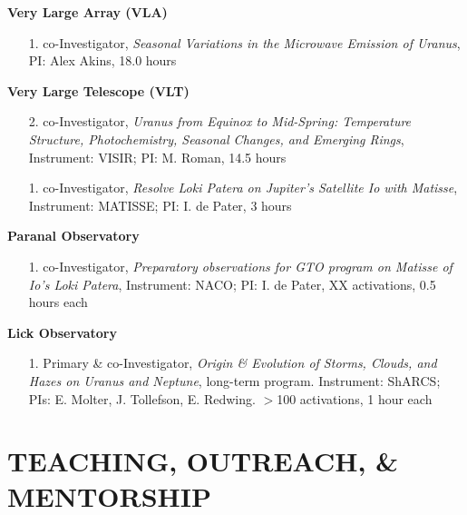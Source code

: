 \documentclass[margin, 10pt]{res} %
\begin{document}
\begin{resume}
\begin{enumerate}
\end{enumerate}
\vspace{-0.3cm}
\textbf{Very Large Array (VLA)}
\begin{enumerate}
	\item[1.] co-Investigator, {\it Seasonal Variations in the Microwave Emission of Uranus}, PI: Alex Akins, 18.0 hours %
\end{enumerate}
\vspace{-0.3cm}
\textbf{Very Large Telescope (VLT)} 
\begin{enumerate}
	\item[2.] co-Investigator, {\it Uranus from Equinox to Mid-Spring: Temperature Structure, Photochemistry, Seasonal Changes, and Emerging Rings}, Instrument: VISIR; PI: M. Roman, 14.5 hours %
	\item[1.] co-Investigator, {\it Resolve Loki Patera on Jupiter’s Satellite Io with Matisse}, Instrument: MATISSE; PI: I. de Pater, 3 hours %
\end{enumerate}
\vspace{-0.3cm}
\textbf{Paranal Observatory}
\begin{enumerate}
	\item[1.] co-Investigator, {\it Preparatory observations for GTO program on Matisse of Io's Loki Patera}, Instrument: NACO; PI: I. de Pater, XX activations, 0.5 hours each %
\end{enumerate}
\vspace{-0.3cm}
\textbf{Lick Observatory} 
\begin{enumerate}
	\item[1.] Primary \& co-Investigator, {\it Origin \& Evolution of Storms, Clouds, and Hazes on Uranus and Neptune}, long-term program. Instrument: ShARCS; PIs: E. Molter, J. Tollefson, E. Redwing. $>$100 activations, 1 hour each %
\end{enumerate}




\section{TEACHING, OUTREACH, \& MENTORSHIP}


\end{resume}
\end{document}
